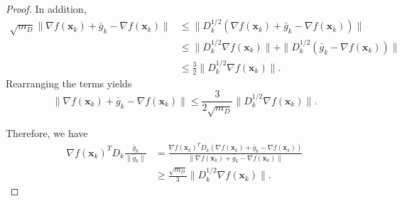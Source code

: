 \documentclass{article}
\newcommand{\bx}{\boldsymbol{x}}
\newcommand{\barg}{\bar{g}}
\theoremstyle{plain}
\theoremstyle{definition}
\theoremstyle{remark}
\begin{document}
\begin{proof}
In addition, 
\begin{align*}
    \sqrt{m_D}\|\nabla f(\bx_k) + \barg_k - \nabla f(\bx_k)\| & \leq \|D_k^{1/2}(\nabla f(\bx_k) + \barg_k - \nabla f(\bx_k))\|\\
    & \leq \|D_k^{1/2}\nabla f(\bx_k)\| + \| D_k^{1/2}(\barg_k - \nabla f(\bx_k))\| \\
    & \leq \frac{3}{2}\|D_k^{1/2}\nabla f(\bx_k)\|.
\end{align*}
Rearranging the terms yields
\begin{equation*}
   \|\nabla f(\bx_k) + \barg_k - \nabla f(\bx_k)\| \leq  \frac{3}{2\sqrt{m_D}}\|D_k^{1/2}\nabla f(\bx_k)\|.
\end{equation*}

Therefore, we have
\begin{align*}
    \nabla f(\bx_k)^TD_k\frac{\barg_k}{\|\barg_k\|} & = \frac{\nabla f(\bx_k)^TD_k(\nabla f(\bx_k)+\barg_k-\nabla f(\bx_k))}{\|\nabla f(\bx_k)+\barg_k-\nabla f(\bx_k)\|}\\
    & \geq \frac{\sqrt{m_D}}{3}\|D_k^{1/2}\nabla f(\bx_k)\|.
\end{align*}



\end{proof}
\end{document}
